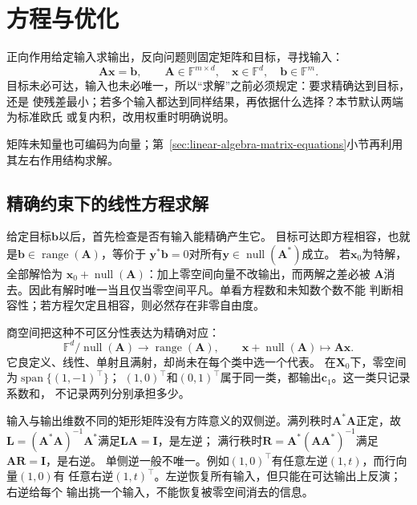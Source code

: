\section{方程与优化}
\label{sec:linear-algebra-reachability-solvability}

正向作用给定输入求输出，反向问题则固定矩阵和目标，寻找输入：
\begin{equation}
 \bm A\bm x=\bm b,\qquad
 \bm A\in\mathbb F^{m\times d},\quad
 \bm x\in\mathbb F^d,\quad\bm b\in\mathbb F^m.
 \label{eq:linear-algebra-linear-system}
\end{equation}
目标未必可达，输入也未必唯一，所以“求解”之前必须规定：要求精确达到目标，还是
使残差最小；若多个输入都达到同样结果，再依据什么选择？本节默认两端为标准欧氏
或复内积，改用权重时明确说明。

矩阵未知量也可编码为向量；第~\ref{sec:linear-algebra-matrix-equations}小节再利用其左右作用结构求解。

\subsection{精确约束下的线性方程求解}
\label{sec:linear-algebra-exact-systems}

给定目标$\bm b$以后，首先检查是否有输入能精确产生它。
目标可达即方程相容，也就是$\bm b\in\operatorname{range}(\bm A)$，等价于
$\bm y^*\bm b=0$对所有$\bm y\in\operatorname{null}(\bm A^*)$成立。
若$\bm x_0$为特解，全部解恰为
$\bm x_0+\operatorname{null}(\bm A)$：加上零空间向量不改输出，而两解之差必被
$\bm A$消去。因此有解时唯一当且仅当零空间平凡。单看方程数和未知数个数不能
判断相容性；若方程欠定且相容，则必然存在非零自由度。

商空间把这种不可区分性表达为精确对应：
\[
 \mathbb F^d/\operatorname{null}(\bm A)
 \longrightarrow\operatorname{range}(\bm A),\qquad
 \bm x+\operatorname{null}(\bm A)\longmapsto\bm A\bm x.
\]
它良定义、线性、单射且满射，却尚未在每个类中选一个代表。
在$\bm X_0$下，零空间为$\operatorname{span}\{(1,-1)^\top\}$；
$(1,0)^\top$和$(0,1)^\top$属于同一类，都输出$\bm c_1$。这一类只记录系数和，
不记录两列分别承担多少。


输入与输出维数不同的矩形矩阵没有方阵意义的双侧逆。满列秩时$\bm A^*\bm A$正定，故
$\bm L=(\bm A^*\bm A)^{-1}\bm A^*$满足$\bm L\bm A=\bm I$，是左逆；
满行秩时$\bm R=\bm A^*(\bm A\bm A^*)^{-1}$满足$\bm A\bm R=\bm I$，是右逆。
单侧逆一般不唯一。例如$(1,0)^\top$有任意左逆$(1,t)$，而行向量$(1,0)$有
任意右逆$(1,t)^\top$。左逆恢复所有输入，但只能在可达输出上反演；右逆给每个
输出挑一个输入，不能恢复被零空间消去的信息。


